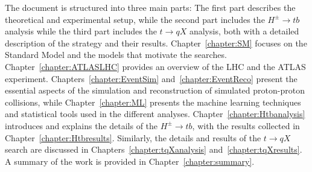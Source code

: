 The document is structured into three main parts: The first part describes the theoretical and experimental setup, while the second part includes the $H^\pm\to tb$ analysis while the third part includes the $t\to qX$ analysis, both with a detailed description of the strategy and their results. Chapter~\ref{chapter:SM} focuses on the Standard Model and the models that motivate the searches. Chapter~\ref{chapter:ATLASLHC} provides an overview of the LHC and the ATLAS experiment. Chapters~\ref{chapter:EventSim} and~\ref{chapter:EventReco} present the essential aspects of the simulation and reconstruction of simulated proton-proton collisions, while Chapter~\ref{chapter:ML} presents the machine learning techniques and statistical tools used in the different analyses. Chapter~\ref{chapter:Htbanalysis} introduces and explains the details of the $H^\pm\to tb$, with the results collected in Chapter~\ref{chapter:Htbresults}. Similarly, the details and results of the $t\to qX$ search are discussed in Chapters~\ref{chapter:tqXanalysis} and~\ref{chapter:tqXresults}. A summary of the work is provided in Chapter~\ref{chapter:summary}.